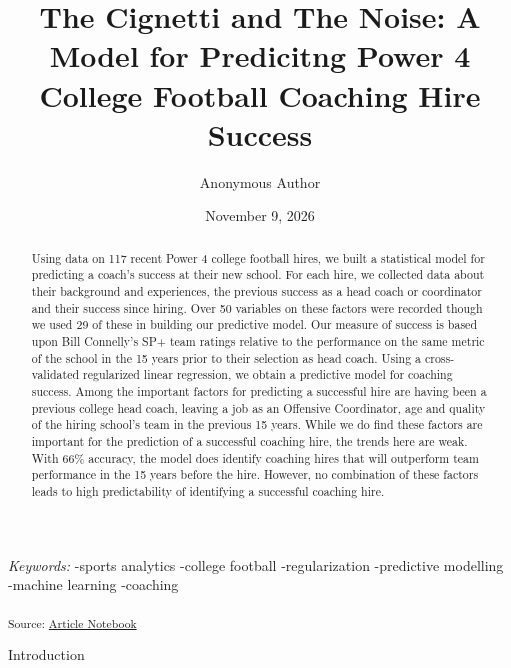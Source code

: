 \documentclass[
  12pt]{article}
\begin{document}
\def\spacingset#1{\renewcommand{\baselinestretch}%
{#1}\small\normalsize} \spacingset{1}



\date{November 9, 2026}
\title{\bf The Cignetti and The Noise: A Model for Predicitng Power 4
College Football Coaching Hire Success}
\author{
Anonymous Author\\
}
\maketitle

\bigskip
\bigskip
\begin{abstract}
Using data on 117 recent Power 4 college football hires, we built a
statistical model for predicting a coach's success at their new school.
For each hire, we collected data about their background and experiences,
the previous success as a head coach or coordinator and their success
since hiring. Over 50 variables on these factors were recorded though we
used 29 of these in building our predictive model. Our measure of
success is based upon Bill Connelly's SP+ team ratings relative to the
performance on the same metric of the school in the 15 years prior to
their selection as head coach. Using a cross-validated regularized
linear regression, we obtain a predictive model for coaching success.
Among the important factors for predicting a successful hire are having
been a previous college head coach, leaving a job as an Offensive
Coordinator, age and quality of the hiring school's team in the previous
15 years. While we do find these factors are important for the
prediction of a successful coaching hire, the trends here are weak. With
66\% accuracy, the model does identify coaching hires that will
outperform team performance in the 15 years before the hire. However, no
combination of these factors leads to high predictability of identifying
a successful coaching hire.
\end{abstract}

\noindent%
{\it Keywords:} -sports analytics -college football -regularization
-predictive modelling -machine learning -coaching
\vfill

\newpage
\spacingset{1.9} %


\textsubscript{Source:
\href{https://schuckers.github.io/cignetti-noise-paper/index.qmd.html}{Article
Notebook}}

Introduction
\end{document}
